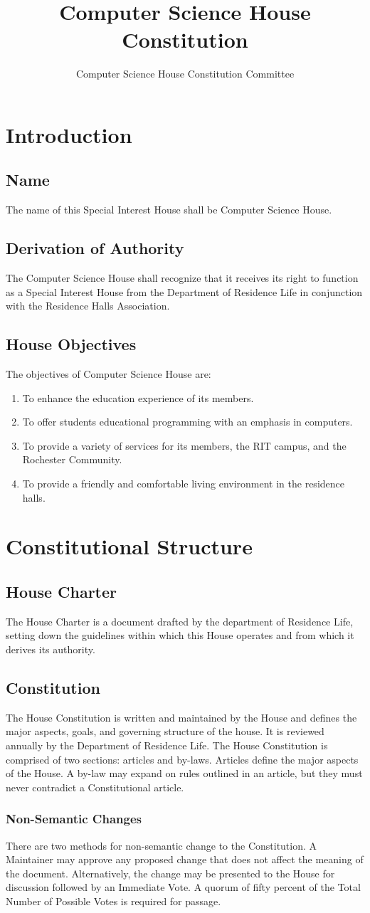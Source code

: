 \documentclass{article}
\title{Computer Science House Constitution}
\author{Computer Science House Constitution Committee}
\date{\datechanged}
\newcommand{\article}[1]{\section{#1} \label{#1}}
\newcommand{\asection}[1]{\subsection{#1} \label{#1}}
\newcommand{\asubsection}[1]{\subsubsection{#1} \label{#1}}
\begin{document}
\maketitle

\article{Introduction}

\asection{Name}
The name of this Special Interest House shall be Computer Science House.

\asection{Derivation of Authority}
The Computer Science House shall recognize that it receives its right to function as a Special Interest House from the Department of Residence Life in conjunction with the Residence Halls Association.

\asection{House Objectives}
The objectives of Computer Science House are:
\begin{enumerate}
	\item To enhance the education experience of its members.
	\item To offer students educational programming with an emphasis in computers.
	\item To provide a variety of services for its members, the RIT campus, and the Rochester Community.
	\item To provide a friendly and comfortable living environment in the residence halls.
\end{enumerate}

\article{Constitutional Structure}

\asection{House Charter}
The House Charter is a document drafted by the department of Residence Life, setting down the guidelines within which this House operates and from which it derives its authority.

\asection{Constitution}
The House Constitution is written and maintained by the House and defines the major aspects, goals, and governing structure of the house.
It is reviewed annually by the Department of Residence Life.
The House Constitution is comprised of two sections: articles and by-laws.
Articles define the major aspects of the House.
A by-law may expand on rules outlined in an article, but they must never contradict a Constitutional article.

\asubsection{Non-Semantic Changes}
There are two methods for non-semantic change to the Constitution.
A Maintainer may approve any proposed change that does not affect the meaning of the document.
Alternatively, the change may be presented to the House for discussion followed by an Immediate Vote.
A quorum of fifty percent of the Total Number of Possible Votes is required for passage.
\end{document}
